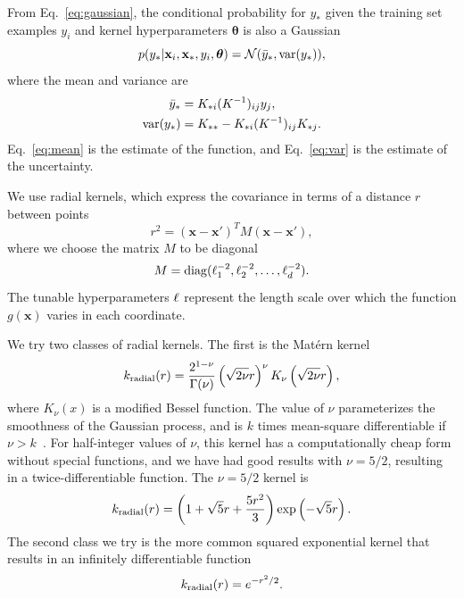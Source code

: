 \documentclass[prd,aps,letter,twocolumn,floatfix,notitlepage,nofootinbib]{revtex4-1}
\def\bx{\mathbf{x}}
\def\btheta{\boldsymbol{\theta}}
\begin{document}
From Eq.~\eqref{eq:gaussian}, the conditional probability for $y_*$ given the training set examples $y_i$ and kernel hyperparameters $\btheta$ is also a Gaussian
\begin{equation}
p(y_* | \bx_i, \bx_*, y_i, \btheta) = \mathcal{N}(\bar y_*, {\rm var}(y_*)),
\end{equation}
where the mean and variance are
\begin{align}
\label{eq:mean}
\bar y_* &= K_{*i} (K^{-1})_{ij} y_j, \\
\label{eq:var}
{\rm var}(y_*) &= K_{**} - K_{*i} (K^{-1})_{ij} K_{*j}.
\end{align}
Eq.~\eqref{eq:mean} is the estimate of the function, and Eq.~\eqref{eq:var} is the estimate of the uncertainty.

We use radial kernels, which express the covariance in terms of a distance $r$ between points
\begin{equation}
r^2 = (\bx - \bx')^T M (\bx - \bx'),
\end{equation}
where we choose the matrix $M$ to be diagonal
\begin{equation}
M = {\rm diag}(\ell_1^{-2}, \ell_2^{-2}, \dots, \ell_d^{-2}).
\end{equation}
The tunable hyperparameters ${\bf \ell}$ represent the length scale over which the function $g(\bx)$ varies in each coordinate. 

We try two classes of radial kernels. The first is the Mat\'{e}rn kernel
\begin{equation}
k_{\rm radial}(r) = \frac{2^{1-\nu}}{\Gamma(\nu)} \left(\sqrt{2\nu} r\right)^\nu K_\nu \left(\sqrt{2\nu} r \right),
\end{equation}
where $K_\nu(x)$ is a modified Bessel function. The value of $\nu$ parameterizes the smoothness of the Gaussian process, and is $k$ times mean-square differentiable if $\nu>k$~\cite{RasmussenWilliams2006}. For half-integer values of $\nu$, this kernel has a computationally cheap form without special functions, and we have had good results with $\nu=5/2$, resulting in a twice-differentiable function. The $\nu=5/2$ kernel is
\begin{equation}
k_{\rm radial}(r) = \left(1+\sqrt{5}r + \frac{5r^2}{3}\right) \exp\left(-\sqrt{5}r\right).
\end{equation}
The second class we try is the more common squared exponential kernel that results in an infinitely differentiable function~\cite{RasmussenWilliams2006}
\begin{equation}
k_{\rm radial}(r) = e^{-r^2/2}.
\end{equation}
\end{document}
